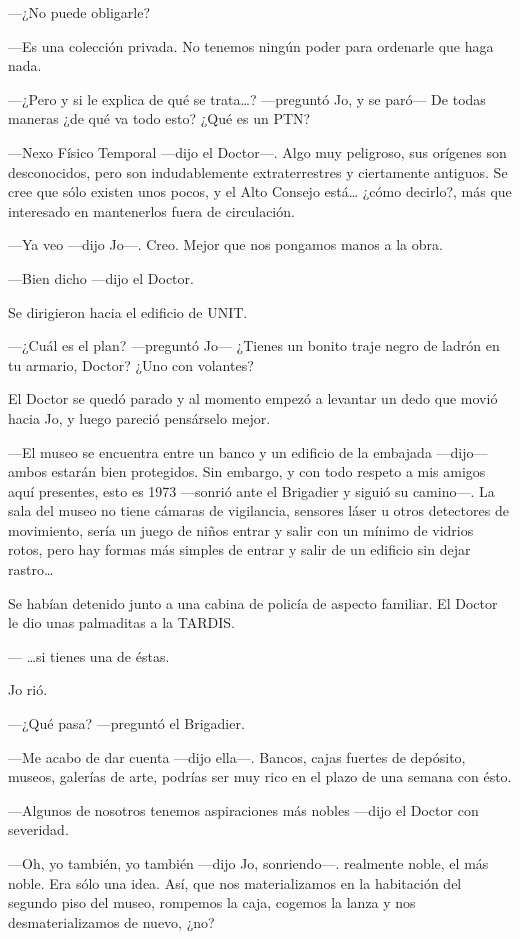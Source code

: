 ---¿No puede obligarle?

---Es una colección privada. No tenemos ningún poder para ordenarle que
haga nada.

---¿Pero y si le explica de qué se trata\ldots{}? ---preguntó Jo, y se
paró--- De todas maneras ¿de qué va todo esto? ¿Qué es un PTN?

---Nexo Físico Temporal ---dijo el Doctor---. Algo muy peligroso, sus
orígenes son desconocidos, pero son indudablemente extraterrestres y
ciertamente antiguos. Se cree que sólo existen unos pocos, y el Alto
Consejo está\ldots{} ¿cómo decirlo?, más que interesado en mantenerlos
fuera de circulación.

---Ya veo ---dijo Jo---. Creo. Mejor que nos pongamos manos a la obra.

---Bien dicho ---dijo el Doctor.

Se dirigieron hacia el edificio de UNIT.

---¿Cuál es el plan? ---preguntó Jo--- ¿Tienes un bonito traje negro de
ladrón en tu armario, Doctor? ¿Uno con volantes?

El Doctor se quedó parado y al momento empezó a levantar un dedo que
movió hacia Jo, y luego pareció pensárselo mejor.

---El museo se encuentra entre un banco y un edificio de la embajada
---dijo--- ambos estarán bien protegidos. Sin embargo, y con todo
respeto a mis amigos aquí presentes, esto es 1973 ---sonrió ante el
Brigadier y siguió su camino---. La sala del museo no tiene cámaras de
vigilancia, sensores láser u otros detectores de movimiento, sería un
juego de niños entrar y salir con un mínimo de vidrios rotos, pero hay
formas más simples de entrar y salir de un edificio sin dejar
rastro\ldots{}

Se habían detenido junto a una cabina de policía de aspecto familiar. El
Doctor le dio unas palmaditas a la TARDIS.

--- \ldots{}si tienes una de éstas.

Jo rió.

---¿Qué pasa? ---preguntó el Brigadier.

---Me acabo de dar cuenta ---dijo ella---. Bancos, cajas fuertes de
depósito, museos, galerías de arte, podrías ser muy rico en el plazo de
una semana con ésto.

---Algunos de nosotros tenemos aspiraciones más nobles ---dijo el Doctor
con severidad.

---Oh, yo también, yo también ---dijo Jo, sonriendo---. realmente noble,
el más noble. Era sólo una idea. Así, que nos materializamos en la
habitación del segundo piso del museo, rompemos la caja, cogemos la
lanza y nos desmaterializamos de nuevo, ¿no?

